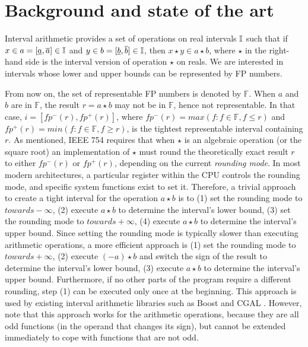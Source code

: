
\section{Background and state of the art}
\label{sec:related}

Interval arithmetic \cite{hickey2001} provides a set of operations on real intervals $\mathbb{I}$ such that if $x\in a=[\underline{a},\overline{a}] \in \mathbb{I}$ and $y\in b=[\underline{b},\overline{b}] \in \mathbb{I}$,
then $x \star y  \in a \star b$, where $\star$ in the right-hand side is the interval version of operation $\star$ on reals.
We are interested in intervals whose lower and upper bounds can be represented by FP numbers.

From now on, the set of representable FP numbers is denoted by $\mathbb{F}$. When $a$ and $b$ are in $\mathbb{F}$, the result $r = a \star b$ may not be in $\mathbb{F}$, hence not representable. 
In that case, $i=[fp^{-}(r),fp^{+}(r)]$, where $fp^{-}(r) = max(f : f \in \mathbb{F}, f \leq r)$ and $fp^{+}(r) = min(f : f \in \mathbb{F}, f \geq r)$, is the tightest representable interval containing $r$.
As mentioned, IEEE 754 requires that when $\star$ is an algebraic operation (or the square root) an implementation of $\star$ must round the theoretically exact result $r$ to either $fp^{-}(r)$ or $fp^{+}(r)$, depending on the current \emph{rounding mode}.
In most modern architectures, a particular register within the CPU controls the rounding mode, and specific system functions exist to set it. Therefore, a trivial approach to create a tight interval for the operation $a \star b$ is to (1) set the rounding mode to $towards -\infty$, (2) execute $a \star b$ to determine the interval's lower bound, (3) set the rounding mode to $towards +\infty$, (4) execute $a \star b$ to determine the interval's upper bound.
Since setting the rounding mode is typically slower than executing arithmetic operations, a more efficient approach is (1) set the rounding mode to $towards +\infty$, (2) execute $(-a) \star b$ and switch the sign of the result to determine the interval's lower bound, (3) execute $a \star b$ to determine the interval's upper bound. Furthermore, if no other parts of the program require a different rounding, step (1) can be executed only once at the beginning.
This approach is used by existing interval arithmetic libraries such as Boost \cite{bronnimann2006} and CGAL \cite{cgal}.
However, note that this approach works for the arithmetic operations, because they are all odd functions (in the operand that changes its sign), but cannot be extended immediately to cope with functions that are not odd. 

